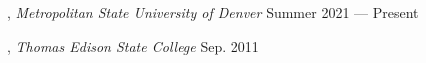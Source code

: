 
,
\textit{Metropolitan State University of Denver} \hfill	Summer 2021 ---
Present

, \textit{Thomas Edison
	State College} \hfill	Sep. 2011

